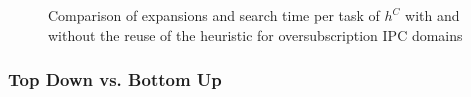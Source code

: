 \begin{figure}[ht]
	\scriptsize
	\begin{minipage}{0.5\textwidth}
		
	\end{minipage}
	\begin{minipage}{0.2\textwidth}
		
	\end{minipage}
	\hfill
	\begin{minipage}{0.2\textwidth}
		
	\end{minipage}
	\begin{minipage}{0.2\textwidth}
		
	\end{minipage}
	\hfill
	\begin{minipage}{0.2\textwidth}
		
	\end{minipage}

	\caption{Comparison of expansions and search time per task of $h^{C}$ with and 
	without the reuse of the heuristic for oversubscription IPC domains}
\end{figure}

\FloatBarrier
\subsubsection{Top Down vs. Bottom Up}
%


